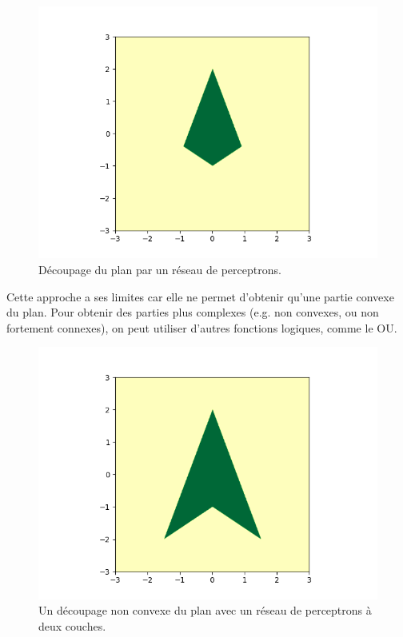 \begin{figure}[h]
  \centering
  \includegraphics[scale=0.5]{assets/perceptron-example2}
  \caption{Découpage du plan par un réseau de perceptrons.}
  \label{fig:perceptron-example2}
\end{figure}

Cette approche a ses limites car elle ne permet d'obtenir qu'une partie convexe 
du plan. Pour obtenir des parties plus complexes (e.g.\/ non convexes, ou non 
fortement connexes), on peut utiliser d'autres fonctions logiques, comme le OU. 

\begin{figure}[h]
  \centering
  \includegraphics[scale=0.5]{assets/perceptron-example3}
  \caption{Un découpage non convexe du plan avec un réseau de perceptrons à deux couches.}
  \label{fig:perceptron-example3}
\end{figure}

